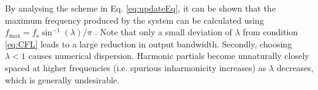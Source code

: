 %
By analysing the scheme in Eq. \eqref{eq:updateEq}, it can be shown that the maximum frequency produced by the system can be calculated using $f_\text{max} = f_\text{s} \sin^{-1}(\lambda)/\pi$ \cite[Chap. 6]{bilbao2009}.
%
Note that only a small deviation of $\lambda$ from condition \eqref{eq:CFL} leads to a large reduction in output bandwidth.
%
Secondly, choosing $\lambda < 1$ causes numerical dispersion. %
Harmonic partials become unnaturally closely spaced at higher frequencies (i.e. spurious inharmonicity increases) as $\lambda$ decreases, which is generally undesirable.


